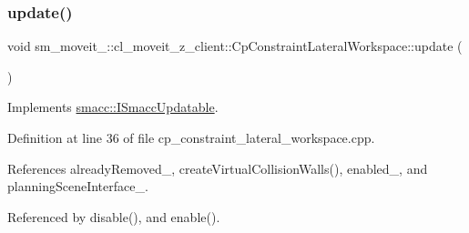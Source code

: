 \subsubsection{\texorpdfstring{update()}{update()}}
{\footnotesize\ttfamily void sm\+\_\+moveit\+\_\+::cl\+\_\+moveit\+\_\+z\+\_\+client\+::\+Cp\+Constraint\+Lateral\+Workspace\+::update (\begin{DoxyParamCaption}{ }\end{DoxyParamCaption})\hspace{0.3cm}{\ttfamily [virtual]}}



Implements \hyperlink{classsmacc_1_1ISmaccUpdatable_a84ee0520cbefdb1d412bed54650b028e}{smacc\+::\+I\+Smacc\+Updatable}.



Definition at line 36 of file cp\+\_\+constraint\+\_\+lateral\+\_\+workspace.\+cpp.



References already\+Removed\+\_\+, create\+Virtual\+Collision\+Walls(), enabled\+\_\+, and planning\+Scene\+Interface\+\_\+.



Referenced by disable(), and enable().


